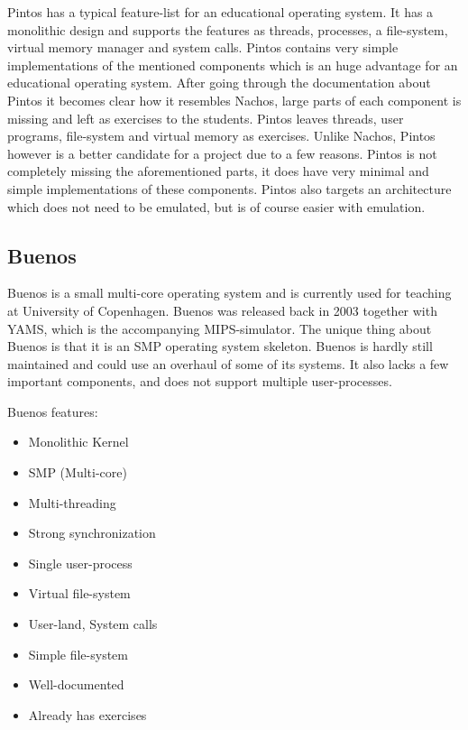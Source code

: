 Pintos has a typical feature-list for an educational operating system. It has a monolithic design and supports the features as threads, processes, a file-system, virtual memory manager and system calls. Pintos contains very simple implementations of the mentioned components which is an huge advantage for an educational operating system.
After going through the documentation about Pintos it becomes clear how it resembles Nachos, large parts of each component is missing and left as exercises to the students. Pintos leaves threads, user programs, file-system and virtual memory as exercises. Unlike Nachos, Pintos however is a better candidate for a project due to a few reasons. Pintos is not completely missing the aforementioned parts, it does have very minimal and simple implementations of these components. Pintos also targets an architecture which does not need to be emulated, but is of course easier with emulation.

\subsection{Buenos}

Buenos is a small multi-core operating system and is currently used for teaching at University of Copenhagen. Buenos was released back in 2003 together with YAMS, which is the accompanying MIPS-simulator. The unique thing about Buenos is that it is an SMP operating system skeleton. Buenos is hardly still maintained and could use an overhaul of some of its systems. It also lacks a few important components, and does not support multiple user-processes.

Buenos features\cite{BuenosRef}:

\begin{itemize}
  \item Monolithic Kernel
  \item SMP (Multi-core)
  \item Multi-threading
  \item Strong synchronization
  \item Single user-process
  \item Virtual file-system
  \item User-land, System calls
  \item Simple file-system
  \item Well-documented
  \item Already has exercises
\end{itemize}

